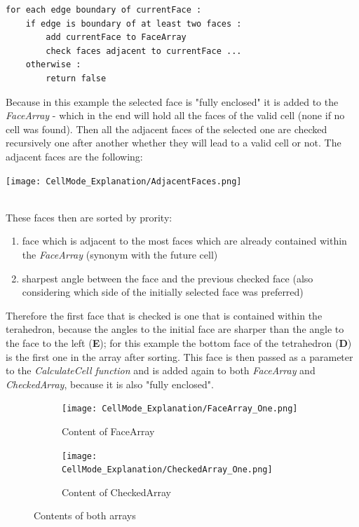 \documentclass{report}
\begin{document}
		\begin{verbatim}
for each edge boundary of currentFace :
	if edge is boundary of at least two faces :
		add currentFace to FaceArray
		check faces adjacent to currentFace ...
	otherwise :
		return false
		\end{verbatim}
		Because in this example the selected face is "fully enclosed" it is added to the \textit{FaceArray} - which in the end will hold all the faces of the valid cell (none if no cell was found). Then all the adjacent faces of the selected one are checked recursively one after another whether they will lead to a valid cell or not. The adjacent faces are the following: \\
		\begin{center}
			\texttt{[image: CellMode\_Explanation/AdjacentFaces.png]}
			\label{pic:pic5.3}
		\end{center}
		\hfill \\
		These faces then are sorted by prority:
		\begin{enumerate}
			\item face which is adjacent to the most faces which are already contained within the \textit{FaceArray} (synonym with the future cell)
			\item sharpest angle between the face and the previous checked face (also considering which side of the initially selected face was preferred)
		\end{enumerate}
		Therefore the first face that is checked is one that is contained within the terahedron, because the angles to the initial face are sharper than the angle to the face to the left (\textbf{E}); for this example the bottom face of the tetrahedron (\textbf{D}) is the first one in the array after sorting. This face is then passed as a parameter to the \textit{CalculateCell function} and is added again to both \textit{FaceArray} and \textit{CheckedArray}, because it is also "fully enclosed". \\
		\begin{figure}[H]
			\centering
			\begin{subfigure}[H]{2.5in}
				\centering
				\texttt{[image: CellMode\_Explanation/FaceArray\_One.png]}
				\caption{Content of FaceArray}
				\label{pic:pic5.4.a}
			\end{subfigure}
			\quad
			\begin{subfigure}[H]{2.5in}
				\centering
				\texttt{[image: CellMode\_Explanation/CheckedArray\_One.png]}
				\caption{Content of CheckedArray}
				\label{pic:pic5.4.b}
			\end{subfigure}
			\caption{Contents of both arrays}
			\label{pic:pic5.4}
		\end{figure}
\end{document}
